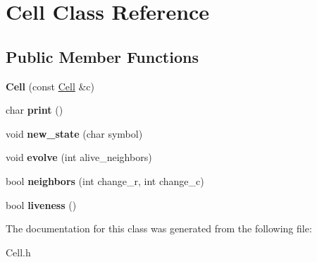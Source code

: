 \hypertarget{classCell}{\section{\-Cell \-Class \-Reference}
\label{classCell}
}
\subsection*{\-Public \-Member \-Functions}
\begin{DoxyCompactItemize}
\item 
\hypertarget{classCell_a51f477d8039e209153054228a5792b0c}{{\bfseries \-Cell} (const \hyperlink{classCell}{\-Cell} \&c)}\label{classCell_a51f477d8039e209153054228a5792b0c}

\item 
\hypertarget{classCell_ae427bac6d57672ca9d170bb82e5d976e}{char {\bfseries print} ()}\label{classCell_ae427bac6d57672ca9d170bb82e5d976e}

\item 
\hypertarget{classCell_aa13732da3a1b8045383d3b58da5e7837}{void {\bfseries new\-\_\-state} (char symbol)}\label{classCell_aa13732da3a1b8045383d3b58da5e7837}

\item 
\hypertarget{classCell_a49cd9f9ef6485444d2b557687e56de4b}{void {\bfseries evolve} (int alive\-\_\-neighbors)}\label{classCell_a49cd9f9ef6485444d2b557687e56de4b}

\item 
\hypertarget{classCell_a040e2b043b3d760e61c74529136cd659}{bool {\bfseries neighbors} (int change\-\_\-r, int change\-\_\-c)}\label{classCell_a040e2b043b3d760e61c74529136cd659}

\item 
\hypertarget{classCell_aa53d49d4980206931d401fc258e960b7}{bool {\bfseries liveness} ()}\label{classCell_aa53d49d4980206931d401fc258e960b7}

\end{DoxyCompactItemize}


\-The documentation for this class was generated from the following file\-:\begin{DoxyCompactItemize}
\item 
\-Cell.\-h\end{DoxyCompactItemize}
